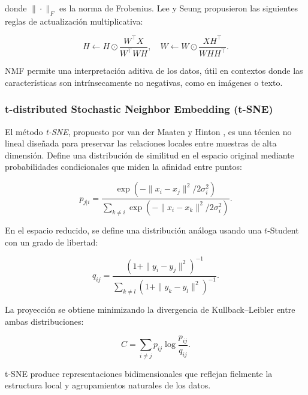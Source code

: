 \documentclass[conference]{IEEEtran}
\begin{document}
donde $\|\cdot\|_F$ es la norma de Frobenius.  
Lee y Seung \cite{lee1999learning} propusieron las siguientes reglas de actualización multiplicativa:

\begin{equation}
H \leftarrow H \odot \frac{W^\top X}{W^\top W H}, \quad
W \leftarrow W \odot \frac{X H^\top}{W H H^\top}.
\end{equation}

NMF permite una interpretación aditiva de los datos, útil en contextos donde las características son intrínsecamente no negativas, como en imágenes o texto.

\subsubsection{t-distributed Stochastic Neighbor Embedding (t-SNE)}

El método \textit{t-SNE}, propuesto por van der Maaten y Hinton \cite{maaten2008tsne}, es una técnica no lineal diseñada para preservar las relaciones locales entre muestras de alta dimensión. Define una distribución de similitud en el espacio original mediante probabilidades condicionales que miden la afinidad entre puntos:

\begin{equation}
p_{j|i} = \frac{\exp(-\|x_i - x_j\|^2 / 2\sigma_i^2)}{\sum_{k \neq i} \exp(-\|x_i - x_k\|^2 / 2\sigma_i^2)}.
\end{equation}

En el espacio reducido, se define una distribución análoga usando una $t$-Student con un grado de libertad:

\begin{equation}
q_{ij} = \frac{(1 + \|y_i - y_j\|^2)^{-1}}{\sum_{k \neq l} (1 + \|y_k - y_l\|^2)^{-1}}.
\end{equation}

La proyección se obtiene minimizando la divergencia de Kullback–Leibler entre ambas distribuciones:

\begin{equation}
C = \sum_{i \neq j} p_{ij} \log \frac{p_{ij}}{q_{ij}}.
\end{equation}

t-SNE produce representaciones bidimensionales que reflejan fielmente la estructura local y agrupamientos naturales de los datos.

\end{document}
